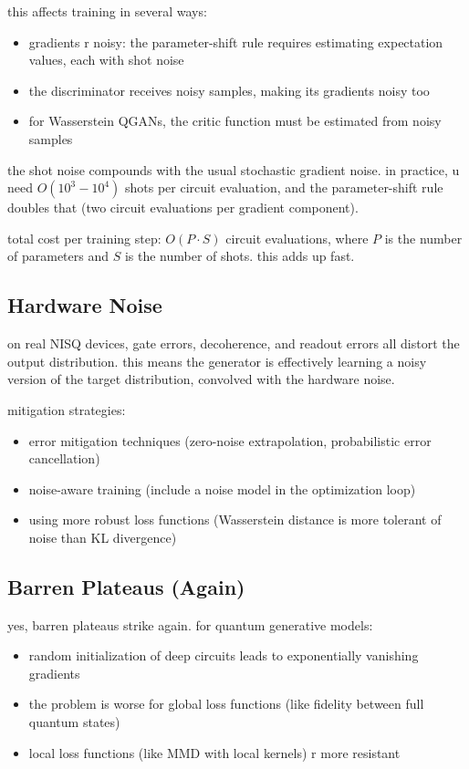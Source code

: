 \documentclass[11pt,a4paper]{article}
\theoremstyle{definition}
\theoremstyle{remark}
\begin{document}
this affects training in several ways:
\begin{itemize}[nosep]
    \item gradients r noisy: the parameter-shift rule requires estimating expectation values, each with shot noise
    \item the discriminator receives noisy samples, making its gradients noisy too
    \item for Wasserstein QGANs, the critic function must be estimated from noisy samples
\end{itemize}

the shot noise compounds with the usual stochastic gradient noise. in practice, u need $O(10^3 - 10^4)$ shots per circuit evaluation, and the parameter-shift rule doubles that (two circuit evaluations per gradient component).

total cost per training step: $O(P \cdot S)$ circuit evaluations, where $P$ is the number of parameters and $S$ is the number of shots. this adds up fast.

\subsection{Hardware Noise}

on real NISQ devices, gate errors, decoherence, and readout errors all distort the output distribution. this means the generator is effectively learning a noisy version of the target distribution, convolved with the hardware noise.

mitigation strategies:
\begin{itemize}[nosep]
    \item error mitigation techniques (zero-noise extrapolation, probabilistic error cancellation)
    \item noise-aware training (include a noise model in the optimization loop)
    \item using more robust loss functions (Wasserstein distance is more tolerant of noise than KL divergence)
\end{itemize}

\subsection{Barren Plateaus (Again)}

yes, barren plateaus strike again. for quantum generative models:
\begin{itemize}[nosep]
    \item random initialization of deep circuits leads to exponentially vanishing gradients
    \item the problem is worse for global loss functions (like fidelity between full quantum states)
    \item local loss functions (like MMD with local kernels) r more resistant
\end{itemize}
\end{document}
